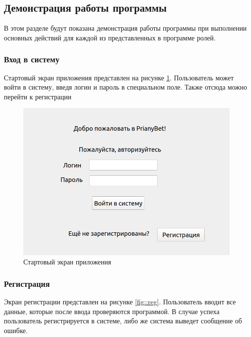 \newpage
\subsection{Демонстрация работы программы}
В этом разделе будут показана демонстрация работы программы при выполнении основных действий для каждой из представленных в программе ролей. 

\subsubsection{Вход в систему}
Стартовый экран приложения представлен на рисунке \ref{fig::start}. 
Пользователь может войти в систему, введя логин и пароль в специальном поле.
Также отсюда можно перейти к регистрации

\FloatBarrier
\begin{figure}[hp]	
	\begin{center}
		\includegraphics[width=\linewidth]{inc/start.png}
	\end{center}
	\caption{Стартовый экран приложения}
	\label{fig::start}
\end{figure}
\FloatBarrier

\newpage
\subsubsection{Регистрация}
Экран регистрации представлен на рисунке \ref{fig::reg}. 
Пользователь вводит все данные, которые после ввода проверяются программой.
В случае успеха пользователь регистрируется в системе, либо же система выведет сообщение об ошибке.

